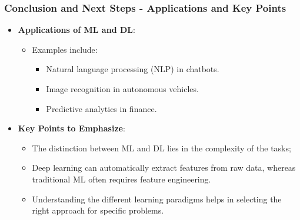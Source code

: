\documentclass[aspectratio=169]{beamer}
\begin{document}
\begin{frame}[fragile]
    \frametitle{Conclusion and Next Steps - Applications and Key Points}

    \begin{itemize}
        \item \textbf{Applications of ML and DL}:
        \begin{itemize}
            \item Examples include:
            \begin{itemize}
                \item Natural language processing (NLP) in chatbots.
                \item Image recognition in autonomous vehicles.
                \item Predictive analytics in finance.
            \end{itemize}
        \end{itemize}
        
        \item \textbf{Key Points to Emphasize}:
        \begin{itemize}
            \item The distinction between ML and DL lies in the complexity of the tasks;
            \item Deep learning can automatically extract features from raw data, whereas traditional ML often requires feature engineering.
            \item Understanding the different learning paradigms helps in selecting the right approach for specific problems.
        \end{itemize}
    \end{itemize}    
\end{frame}
\end{document}
